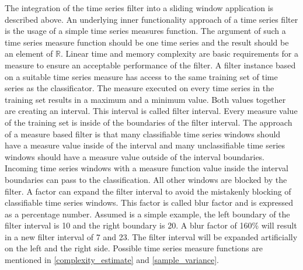 The integration of the time series filter into a sliding window application is described above. An underlying inner
functionality approach of a time series filter is the usage of a simple time series measures function. The argument of
such a time series measure function should be one time series and the result should be an element of $\mathbb{R}$.
Linear time and memory complexity are basic requirements for a measure to ensure an acceptable performance of the
filter. A filter instance based on a suitable time series measure has access to the same training set of time series as
the classificator. The measure executed on every time series in the training set results in a maximum and a minimum
value. Both values together are creating an interval. This interval is called filter interval. Every measure value of the
training set is inside of the boundaries of the filter interval. The approach of a measure based filter is that many
classifiable time series windows should have a measure value inside of the interval and many unclassifiable time series
windows should have a measure value outside of the interval boundaries. Incoming time series windows with a measure
function value inside the interval boundaries can pass to the classification. All other windows are blocked by the
filter. A factor can expand the filter interval to avoid the mistakenly blocking of classifiable time series windows.
This factor is called blur factor and is expressed as a percentage number. Assumed is a simple example, the left
boundary of the filter interval is 10 and the right boundary is 20. A blur factor of 160\% will result in a new filter
interval of 7 and 23. The filter interval will be expanded artificially on the left and the right side. Possible time
series measure functions are mentioned in \ref{complexity_estimate} and \ref{sample_variance}.
